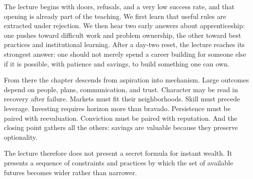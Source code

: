 The lecture begins with doors, refusals, and a very low success rate, and that opening is already part of the teaching. We first learn that useful rules are extracted under rejection. We then hear two early answers about apprenticeship: one pushes toward difficult work and problem ownership, the other toward best practices and institutional learning. After a day-two reset, the lecture reaches its strongest answer: one should not merely spend a career building for someone else if it is possible, with patience and savings, to build something one can own.

From there the chapter descends from aspiration into mechanism. Large outcomes depend on people, plans, communication, and trust. Character may be read in recovery after failure. Markets must fit their neighborhoods. Skill must precede leverage. Investing requires horizon more than bravado. Persistence must be paired with reevaluation. Conviction must be paired with reputation. And the closing point gathers all the others: savings are valuable because they preserve optionality.

The lecture therefore does not present a secret formula for instant wealth. It presents a sequence of constraints and practices by which the set of available futures becomes wider rather than narrower.